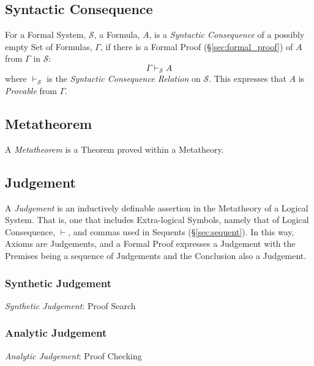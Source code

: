\subsection{Syntactic Consequence}\label{sec:syntactic_consequence}

For a Formal System, $\mathcal{S}$, a Formula, $A$, is a \emph{Syntactic
  Consequence} of a possibly empty Set of Formulas, $\Gamma$, if there
is a Formal Proof (\S\ref{sec:formal_proof}) of $A$ from $\Gamma$ in
$\mathcal{S}$:
\[
  \Gamma \vdash_{\mathcal{S}} A
\]
where $\vdash_{\mathcal{S}}$ is the \emph{Syntactic Consequence
  Relation} on $\mathcal{S}$. This expresses that $A$ is
\emph{Provable} from $\Gamma$.



\subsection{Metatheorem}\label{sec:metatheorem}

A \emph{Metatheorem} is a Theorem proved within a Metatheory.



\subsection{Judgement}\label{sec:judgement}

A \emph{Judgement} is an inductively definable assertion in the
Metatheory of a Logical System. That is, one that includes
Extra-logical Symbols, namely that of Logical Consequence, $\vdash$,
and commas used in Sequents (\S\ref{sec:sequent}). In this way, Axioms
are Judgements, and a Formal Proof expresses a Judgement with the
Premises being a sequence of Judgements and the Conclusion also a
Judgement.



\subsubsection{Synthetic Judgement}\label{sec:synthetic_judgement}

\emph{Synthetic Judgement}: Proof Search



\subsubsection{Analytic Judgement}\label{sec:analytic_judgement}

\emph{Analytic Judgement}: Proof Checking

